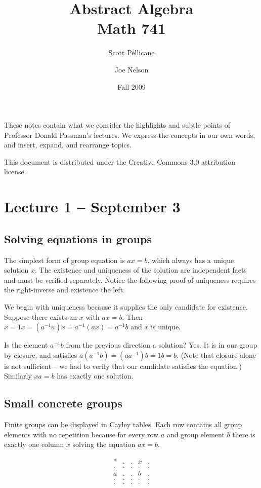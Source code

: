 \documentclass[letterpaper]{article}
\begin{document}
\title{Abstract Algebra\\
Math 741}
\author{Scott Pellicane \and Joe Nelson}
\date{Fall 2009}
\maketitle

These notes contain what we consider the highlights and subtle points of Professor Donald Passman's lectures. We express the concepts in our own words, and insert, expand, and rearrange topics.

This document is distributed under the Creative Commons 3.0 attribution license.

\section{Lecture 1 -- September 3}

\subsection{Solving equations in groups}

The simplest form of group equation is $ax = b$, which always has a unique solution $x$. The existence and uniqueness of the solution are independent facts and must be verified separately. Notice the following proof of uniqueness requires the right-inverse and existence the left.

We begin with uniqueness because it supplies the only candidate for existence.  Suppose there exists an $x$ with $ax = b$. Then $x = 1x = (a^{-1}a)x = a^{-1}(ax) = a^{-1}b$ and $x$ is unique.

Is the element $a^{-1}b$ from the previous direction a solution? Yes. It is in our group by closure, and satisfies $a(a^{-1}b) = (aa^{-1})b = 1b = b$.  (Note that closure alone is not sufficient -- we had to verify that our candidate satisfies the equation.) Similarly $xa = b$ has exactly one solution.

\subsection{Small concrete groups}

Finite groups can be displayed in Cayley tables. Each row contains all group elements with no repetition because for every row $a$ and group element $b$ there is exactly one column $x$ solving the equation $ax = b$.

\[
\begin{array}{r|*{5}{r}}
* & . & . & x & . \\
\hline
. & . & . & . & . \\
a & . & . & b & . \\
. & . & . & . & . \\
. & . & . & . & . \\
\end{array}
\]
\end{document}
